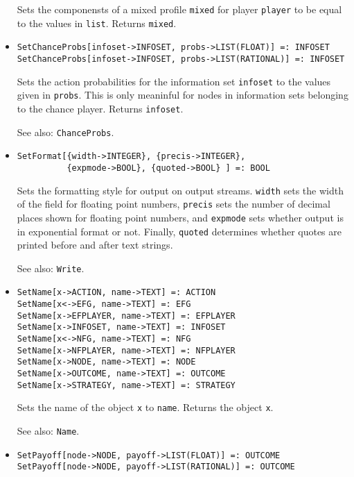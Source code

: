 \begin{itemize}
\bd
Sets the componensts of a mixed profile \verb+mixed+ for player
\verb+player+ to be equal to the values in \verb+list+.
Returns \verb+mixed+. 
\ed

\item
\protect \large \begin{verbatim} 
SetChanceProbs[infoset->INFOSET, probs->LIST(FLOAT)] =: INFOSET
SetChanceProbs[infoset->INFOSET, probs->LIST(RATIONAL)] =: INFOSET
\end{verbatim}\normalsize

\bd
Sets the action probabilities for the information set
\verb+infoset+ to the values given in \verb+probs+.  This is only
meaninful for nodes in information sets belonging to the chance
player.  Returns \verb+infoset+. 
\item
[See also:] {\tt ChanceProbs}.
\ed


\item
\protect \large \begin{verbatim}
SetFormat[{width->INTEGER}, {precis->INTEGER}, 
          {expmode->BOOL}, {quoted->BOOL} ] =: BOOL
\end{verbatim}\normalsize

\bd 
Sets the formatting style for output on output streams.
\verb+width+ sets the width of the field for floating point numbers,
\verb+precis+ sets the number of decimal places shown for floating
point numbers, and \verb+expmode+ sets whether output is in
exponential format or not.  Finally, \verb+quoted+ determines whether
quotes are printed before and after text strings.
\item
[See also:] {\tt Write}.
\ed

\item
\protect \large \begin{verbatim}
SetName[x->ACTION, name->TEXT] =: ACTION
SetName[x<->EFG, name->TEXT] =: EFG
SetName[x->EFPLAYER, name->TEXT] =: EFPLAYER
SetName[x->INFOSET, name->TEXT] =: INFOSET
SetName[x<->NFG, name->TEXT] =: NFG
SetName[x->NFPLAYER, name->TEXT] =: NFPLAYER
SetName[x->NODE, name->TEXT] =: NODE
SetName[x->OUTCOME, name->TEXT] =: OUTCOME
SetName[x->STRATEGY, name->TEXT] =: STRATEGY
\end{verbatim}\normalsize

\bd
Sets the name of the object \verb+x+ to \verb+name+.
Returns the object \verb+x+.
\item
[See also:] {\tt Name}.
\ed

\item
\protect \large \begin{verbatim}
SetPayoff[node->NODE, payoff->LIST(FLOAT)] =: OUTCOME
SetPayoff[node->NODE, payoff->LIST(RATIONAL)] =: OUTCOME
\end{verbatim}\normalsize


\end{itemize}
